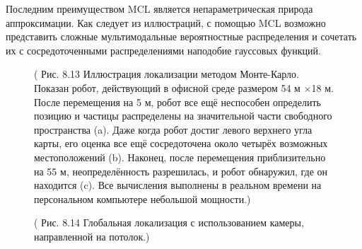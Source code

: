 \documentclass[10pt,a4paper]{article}
\begin{document}
Последним преимуществом MCL является непараметрическая природа аппроксимации. Как следует из иллюстраций, с помощью MCL возможно представить сложные мультимодальные вероятностные распределения и сочетать их с сосредоточенными распределениями наподобие гауссовых функций.

\begin{figure}[H]
	\caption{ ( Рис. 8.13 Иллюстрация локализации методом Монте-Карло. Показан робот, действующий в офисной среде размером 54 м $\times$18 м.  После перемещения на 5 м, робот все ещё неспособен определить позицию и частицы распределены на значительной части свободного пространства (a). Даже когда робот достиг левого верхнего угла карты, его оценка все ещё сосредоточена около четырёх возможных местоположений (b). Наконец, после перемещения приблизительно на 55 м, неопределённость разрешилась, и робот обнаружил, где он находится (c). Все вычисления выполнены в реальном времени на  персональном компьютере небольшой мощности.)}
	\label{fig:813orig}
\end{figure}

\begin{figure}[H]
	\caption{ ( Рис. 8.14    Глобальная локализация с использованием камеры, направленной на потолок.)}
	\label{fig:814orig}
\end{figure}
\end{document}
